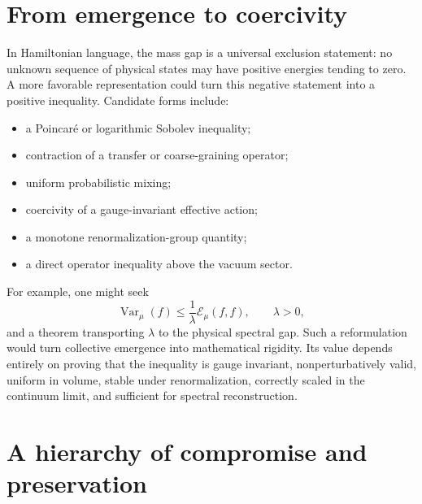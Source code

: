 \documentclass[11pt]{article}
\begin{document}
\section{From emergence to coercivity}

In Hamiltonian language, the mass gap is a universal exclusion statement: no
unknown sequence of physical states may have positive energies tending to
zero.  A more favorable representation could turn this negative statement into
a positive inequality.  Candidate forms include:
\begin{itemize}[leftmargin=2em]
  \item a Poincar\'e or logarithmic Sobolev inequality;
  \item contraction of a transfer or coarse-graining operator;
  \item uniform probabilistic mixing;
  \item coercivity of a gauge-invariant effective action;
  \item a monotone renormalization-group quantity;
  \item a direct operator inequality above the vacuum sector.
\end{itemize}

For example, one might seek
\begin{equation}
  \operatorname{Var}_{\mu}(f)
  \leq
  \frac{1}{\lambda}\mathcal E_{\mu}(f,f),
  \qquad \lambda>0,
  \label{eq:poincare}
\end{equation}
and a theorem transporting $\lambda$ to the physical spectral gap.  Such a
reformulation would turn collective emergence into mathematical rigidity.  Its
value depends entirely on proving that the inequality is gauge invariant,
nonperturbatively valid, uniform in volume, stable under renormalization,
correctly scaled in the continuum limit, and sufficient for spectral
reconstruction.

\section{A hierarchy of compromise and preservation}
\end{document}
